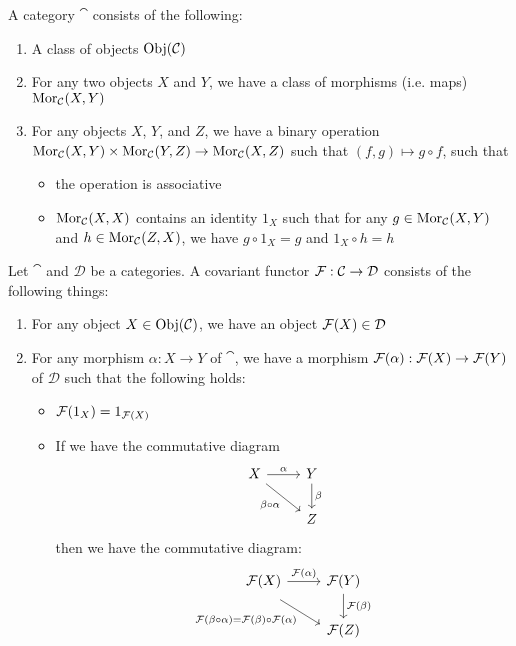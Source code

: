 \begin{defn} [Category]
    A category $\cat$ consists of the following:
    \begin{enumerate}
        \item A class of objects $\operatorname{Obj}(\mathcal C)$
        \item For any two objects $X$ and $Y$, we have a class of morphisms (i.e. maps) $\operatorname{Mor}_\mathcal C(X,Y)$
        \item For any objects $X$, $Y$, and $Z$, we have a binary operation $\operatorname{Mor}_\mathcal C(X,Y)\times \operatorname{Mor}_\mathcal C (Y,Z)\to \operatorname{Mor}_\mathcal C(X,Z)$ such that $(f,g)\mapsto g\circ f$, such that
        \begin{itemize}
            \item the operation is associative
            \item $\operatorname{Mor}_\mathcal C(X,X)$ contains an identity $1_X$ such that for any $g\in \operatorname{Mor}_\mathcal C(X,Y)$ and $h\in \operatorname{Mor}_\mathcal C(Z,X)$, we have $g\circ 1_X = g$ and $1_X\circ h = h$
        \end{itemize}
    \end{enumerate}
\end{defn}

\medskip 

\begin{defn} 
    Let $\cat$ and $\mathcal D$ be a categories. A covariant functor $\mathcal F:\mathcal C \to \mathcal D$ consists of the following things:
    \begin{enumerate}
        \item For any object $X\in \operatorname{Obj}(\mathcal C)$, we have an object $\mathcal F(X)\in \mathcal D$
        \item For any morphism $\alpha:X\to Y$ of $\cat$, we have a morphism $\mathcal F(\alpha):\mathcal F(X)\to \mathcal F(Y)$ of $\mathcal D$ such that the following holds:
        \begin{itemize}
            \item $\mathcal F(1_X) = 1_{\mathcal F(X)}$
            \item If we have the commutative diagram
            \[\begin{tikzcd}[sep=small]
	        X && Y \\
	        \\
	        && Z
	        \arrow["\alpha", from=1-1, to=1-3]
	        \arrow["{\beta\circ \alpha}"', from=1-1, to=3-3]
	        \arrow["\beta", from=1-3, to=3-3]
            \end{tikzcd}\]
            then we have the commutative diagram:
            \[\begin{tikzcd}[sep=small]
	        {\f(X)} && {\f(Y)} \\
	        \\
	        && {\f(Z)}
	        \arrow["{\f(\alpha)}", from=1-1, to=1-3]
	        \arrow["{\f(\beta\circ \alpha) = \f(\beta) \circ \f(\alpha)}"', shift right=2, from=1-1, to=3-3]
	        \arrow["{\f(\beta)}", from=1-3, to=3-3]
            \end{tikzcd}\]
        \end{itemize}
    \end{enumerate}
\end{defn}

